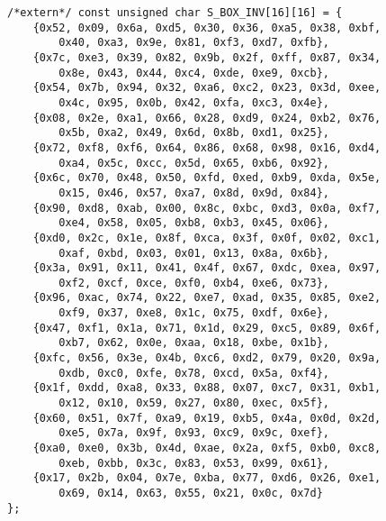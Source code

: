 \documentclass[a4paper]{report}
\begin{document}
\begin{lstlisting}
/*extern*/ const unsigned char S_BOX_INV[16][16] = {
    {0x52, 0x09, 0x6a, 0xd5, 0x30, 0x36, 0xa5, 0x38, 0xbf,
        0x40, 0xa3, 0x9e, 0x81, 0xf3, 0xd7, 0xfb},
    {0x7c, 0xe3, 0x39, 0x82, 0x9b, 0x2f, 0xff, 0x87, 0x34,
        0x8e, 0x43, 0x44, 0xc4, 0xde, 0xe9, 0xcb},
    {0x54, 0x7b, 0x94, 0x32, 0xa6, 0xc2, 0x23, 0x3d, 0xee,
        0x4c, 0x95, 0x0b, 0x42, 0xfa, 0xc3, 0x4e},
    {0x08, 0x2e, 0xa1, 0x66, 0x28, 0xd9, 0x24, 0xb2, 0x76,
        0x5b, 0xa2, 0x49, 0x6d, 0x8b, 0xd1, 0x25},
    {0x72, 0xf8, 0xf6, 0x64, 0x86, 0x68, 0x98, 0x16, 0xd4,
        0xa4, 0x5c, 0xcc, 0x5d, 0x65, 0xb6, 0x92},
    {0x6c, 0x70, 0x48, 0x50, 0xfd, 0xed, 0xb9, 0xda, 0x5e,
        0x15, 0x46, 0x57, 0xa7, 0x8d, 0x9d, 0x84},
    {0x90, 0xd8, 0xab, 0x00, 0x8c, 0xbc, 0xd3, 0x0a, 0xf7,
        0xe4, 0x58, 0x05, 0xb8, 0xb3, 0x45, 0x06},
    {0xd0, 0x2c, 0x1e, 0x8f, 0xca, 0x3f, 0x0f, 0x02, 0xc1,
        0xaf, 0xbd, 0x03, 0x01, 0x13, 0x8a, 0x6b},
    {0x3a, 0x91, 0x11, 0x41, 0x4f, 0x67, 0xdc, 0xea, 0x97,
        0xf2, 0xcf, 0xce, 0xf0, 0xb4, 0xe6, 0x73},
    {0x96, 0xac, 0x74, 0x22, 0xe7, 0xad, 0x35, 0x85, 0xe2,
        0xf9, 0x37, 0xe8, 0x1c, 0x75, 0xdf, 0x6e},
    {0x47, 0xf1, 0x1a, 0x71, 0x1d, 0x29, 0xc5, 0x89, 0x6f,
        0xb7, 0x62, 0x0e, 0xaa, 0x18, 0xbe, 0x1b},
    {0xfc, 0x56, 0x3e, 0x4b, 0xc6, 0xd2, 0x79, 0x20, 0x9a,
        0xdb, 0xc0, 0xfe, 0x78, 0xcd, 0x5a, 0xf4},
    {0x1f, 0xdd, 0xa8, 0x33, 0x88, 0x07, 0xc7, 0x31, 0xb1,
        0x12, 0x10, 0x59, 0x27, 0x80, 0xec, 0x5f},
    {0x60, 0x51, 0x7f, 0xa9, 0x19, 0xb5, 0x4a, 0x0d, 0x2d,
        0xe5, 0x7a, 0x9f, 0x93, 0xc9, 0x9c, 0xef},
    {0xa0, 0xe0, 0x3b, 0x4d, 0xae, 0x2a, 0xf5, 0xb0, 0xc8,
        0xeb, 0xbb, 0x3c, 0x83, 0x53, 0x99, 0x61},
    {0x17, 0x2b, 0x04, 0x7e, 0xba, 0x77, 0xd6, 0x26, 0xe1,
        0x69, 0x14, 0x63, 0x55, 0x21, 0x0c, 0x7d}
};


\end{lstlisting}
\end{document}
